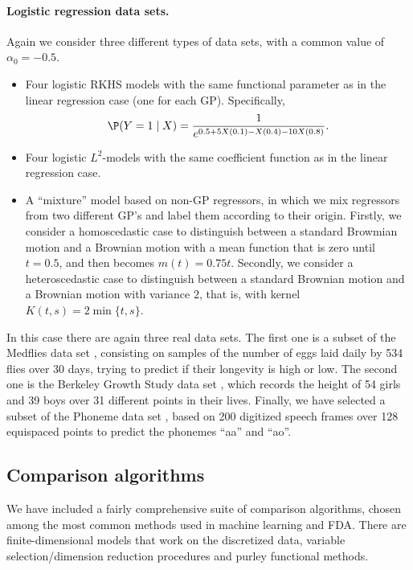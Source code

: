 \paragraph{Logistic regression data sets.} Again we consider three different types of data sets,  with a common value of \(\alpha_0=-0.5\).
\begin{itemize}
  \item Four logistic RKHS models with the same functional parameter as in the linear regression case (one for each GP). Specifically,
  \[
  \P(Y=1\mid X) = \frac{1}{e^{0.5 +5X(0.1) - X(0.4) - 10X(0.8)}}.
  \]
  \item Four logistic \(L^2\)-models with the same coefficient function as in the linear regression case.
  \item A ``mixture'' model based on non-GP regressors, in which we mix regressors from two different GP's and label them according to their origin. Firstly, we consider a homoscedastic case to distinguish between a standard Browmian motion and a Brownian motion with a mean function that is zero until \(t=0.5\), and then becomes \(m(t)=0.75t\). Secondly, we consider a heteroscedastic case to distinguish between a standard Brownian motion and a Brownian motion with variance \(2\), that is, with kernel \(K(t,s)=2\min\{t,s\}\).
\end{itemize}
In this case there are again three real data sets. The first one is a subset of the Medflies data set \citep{carey1998relationship}, consisting on samples of the number of eggs laid daily by 534 flies over 30 days, trying to predict if their longevity is high or low. The second one is the Berkeley Growth Study data set \citep{tuddenham1954physical}, which records the height of 54 girls and 39 boys over 31 different points in their lives. Finally, we have selected a subset of the Phoneme data set \citep{hastie1995penalized}, based on 200 digitized speech frames over 128 equispaced points to predict the phonemes ``aa'' and ``ao''.

\subsection*{Comparison algorithms}

We have included a fairly comprehensive suite of comparison algorithms, chosen among the most common methods used in machine learning and FDA. There are finite-dimensional models that work on the discretized data, variable selection/dimension reduction procedures and purley functional methods.

